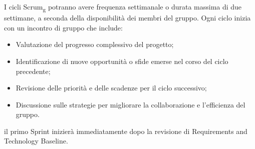I cicli Scrum\textsubscript{g} potranno avere frequenza settimanale o durata massima di due settimane, a seconda della disponibilità dei membri del gruppo.
Ogni ciclo inizia con un incontro di gruppo che include:
\begin{itemize}
\item Valutazione del progresso complessivo del progetto;
\item Identificazione di nuove opportunità o sfide emerse nel corso del ciclo precedente;
\item Revisione delle priorità e delle scadenze per il ciclo successivo;
\item Discussione sulle strategie per migliorare la collaborazione e l'efficienza del gruppo.
\end{itemize}
il primo Sprint inizierà immediatamente dopo la revisione di Requirements and Technology Baseline.


